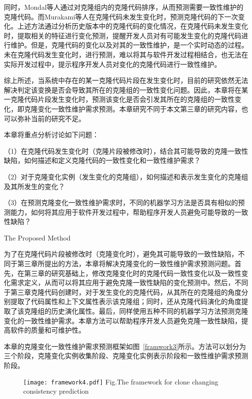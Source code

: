 同时，Mondal等人通过对克隆组内的克隆代码排序，从而预测需要一致性维护的克隆代码\cite{mondal2014prediction}。而Murakami等人在克隆代码未发生变化时，预测克隆代码的下一次变化\cite{murakami2014predicting}。上述方法通过分析历史版本中的克隆代码的变化情况，在克隆代码未发生变化时，提取相关的特征进行变化预测，提醒开发人员对有可能发生变化的克隆代码进行维护。但是，克隆代码的变化以及对其的一致性维护，是一个实时动态的过程。未在克隆代码发生变化时，进行预测，难以将其与软件开发过程相结合，也无法在实际开发过程中，提示程序开发人员对变化的克隆代码进行一致性维护。


综上所述，当系统中存在的某一克隆代码片段在发生变化时，目前的研究依然无法解决判定该变换是否会导致其所在的克隆组的一致性变化问题。因此，本章将在某一克隆代码片段发生变化时，预测该变化是否会引发其所在的克隆组的一致性变化，即克隆变化一致性维护需求预测。本章研究不同于本文第三章的研究内容，也可以弥补当前的研究不足。

本章将重点分析讨论如下问题：

（1）在克隆代码发生变化时（克隆片段被修改时），结合其可能导致的克隆一致性缺陷，如何描述和定义克隆代码的一致性变化和一致性维护需求？

（2）对于克隆变化实例（发生变化的克隆组），如何描述和表示发生变化的克隆组及其所发生的变化？

（3）在预测克隆变化一致性维护需求时，不同的机器学习方法是否具有相似的预测能力，如何将其应用于软件开发过程中，帮助程序开发人员避免可能导致的一致性缺陷？

{The Proposed Method}

为了在克隆代码片段被修改时（克隆变化时），避免其可能导致的一致性缺陷，不同于第三章所提出的方法，本章将解决克隆变化的一致性维护需求预测问题。首先，在第三章的研究基础上，修改克隆变化时的克隆代码一致性变化以及一致性变化需求定义，从而可以将其应用于避免克隆一致性缺陷的变化预测中。然后，不同于第三章克隆代码创建时，对于发生变化的克隆代码，从其所在的克隆组的角度分别提取了代码属性和上下文属性表示该克隆组；同时，还从克隆代码演化的角度提取了该克隆组的历史演化属性。最后，同样使用五种不同的机器学习方法预测克隆变化的一致性维护需求。本章方法可以帮助程序开发人员避免克隆一致性缺陷，提高软件的质量和可维护性。

本章的克隆变化一致性维护需求预测框架如图~\ref{framwork3}所示。方法可以划分为三个阶段，克隆变化实例收集阶段、克隆变化实例表示阶段和一致性维护需求预测阶段。

\begin{figure}[htbp]
\centering
\texttt{[image: framework4.pdf]}
{Fig.$\!$}{The framework for clone changing consistency prediction}
\vspace{-1em}
\end{figure}


